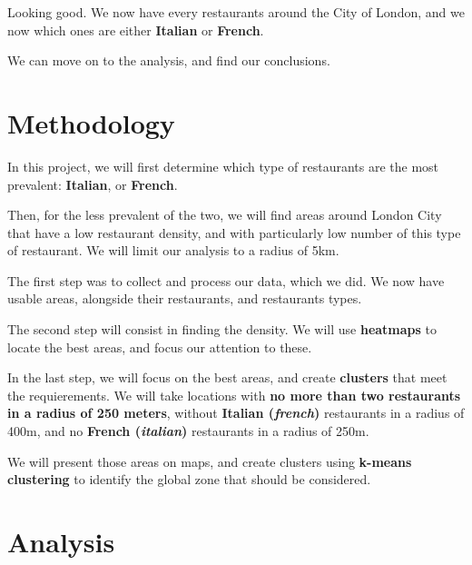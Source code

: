 \documentclass[11pt]{article}
\begin{document}
    Looking good. We now have every restaurants around the City of London,
and we now which ones are either \textbf{Italian} or \textbf{French}.

We can move on to the analysis, and find our conclusions.


    \hypertarget{methodology}{%
\section{\texorpdfstring{Methodology
}{Methodology }}\label{methodology}}

In this project, we will first determine which type of restaurants are
the most prevalent: \textbf{Italian}, or \textbf{French}.

Then, for the less prevalent of the two, we will find areas around
London City that have a low restaurant density, and with particularly
low number of this type of restaurant. We will limit our analysis to a
radius of 5km.

The first step was to collect and process our data, which we did. We now
have usable areas, alongside their restaurants, and restaurants types.

The second step will consist in finding the density. We will use
\textbf{heatmaps} to locate the best areas, and focus our attention to
these.

In the last step, we will focus on the best areas, and create
\textbf{clusters} that meet the requierements. We will take locations
with \textbf{no more than two restaurants in a radius of 250 meters},
without \textbf{Italian (\emph{french})} restaurants in a radius of
400m, and no \textbf{French (\emph{italian})} restaurants in a radius of
250m.

We will present those areas on maps, and create clusters using
\textbf{k-means clustering} to identify the global zone that should be
considered.


    \hypertarget{analysis}{%
\section{\texorpdfstring{Analysis }{Analysis }}\label{analysis}}
\end{document}
